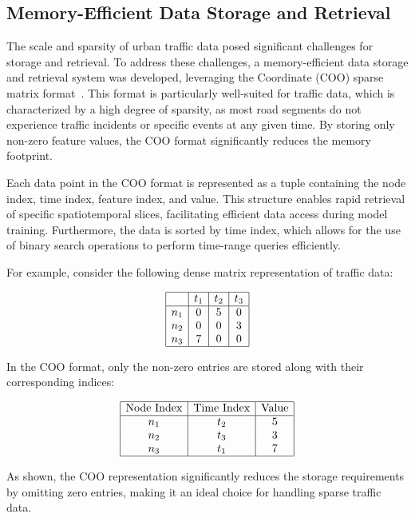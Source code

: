 \documentclass[11pt, a4paper]{article}
\begin{document}
\subsection{Memory-Efficient Data Storage and Retrieval}

The scale and sparsity of urban traffic data posed significant challenges for storage and retrieval. To address these challenges, a memory-efficient data storage and retrieval system was developed, leveraging the Coordinate (COO) sparse matrix format~\cite{virtanen2020scipy,davis2006direct}. This format is particularly well-suited for traffic data, which is characterized by a high degree of sparsity, as most road segments do not experience traffic incidents or specific events at any given time. By storing only non-zero feature values, the COO format significantly reduces the memory footprint.

Each data point in the COO format is represented as a tuple containing the node index, time index, feature index, and value. This structure enables rapid retrieval of specific spatiotemporal slices, facilitating efficient data access during model training. Furthermore, the data is sorted by time index, which allows for the use of binary search operations to perform time-range queries efficiently.

For example, consider the following dense matrix representation of traffic data:

$$
\begin{array}{|c|c|c|c|}
\hline
 & t_1 & t_2 & t_3 \\
\hline
n_1 & 0 & 5 & 0 \\
n_2 & 0 & 0 & 3 \\
n_3 & 7 & 0 & 0 \\
\hline
\end{array}
$$

In the COO format, only the non-zero entries are stored along with their corresponding indices:

$$
\begin{array}{|c|c|c|}
\hline
\text{Node Index} & \text{Time Index} & \text{Value} \\
\hline
n_1 & t_2 & 5 \\
n_2 & t_3 & 3 \\
n_3 & t_1 & 7 \\
\hline
\end{array}
$$

As shown, the COO representation significantly reduces the storage requirements by omitting zero entries, making it an ideal choice for handling sparse traffic data.
\end{document}
